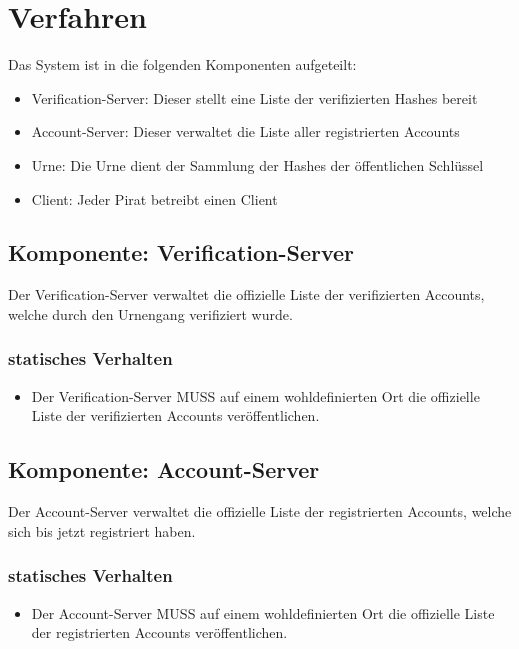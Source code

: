 \documentclass[a4paper,10pt]{article}
\begin{document}
\section{Verfahren} \label{sec:verfahren}
Das System ist in die folgenden Komponenten aufgeteilt:
\begin{itemize}
 \item Verification-Server: Dieser stellt eine Liste der verifizierten Hashes bereit
 \item Account-Server: Dieser verwaltet die Liste aller registrierten Accounts
 \item Urne: Die Urne dient der Sammlung der Hashes der öffentlichen Schlüssel
 \item Client: Jeder Pirat betreibt einen Client
\end{itemize}

\subsection{Komponente: Verification-Server}
Der Verification-Server verwaltet die offizielle Liste der verifizierten Accounts, welche durch den Urnengang verifiziert wurde.
\subsubsection{statisches Verhalten}
\begin{itemize}
 \item Der Verification-Server MUSS auf einem wohldefinierten Ort die offizielle Liste der verifizierten Accounts veröffentlichen.
\end{itemize}


\subsection{Komponente: Account-Server}
Der Account-Server verwaltet die offizielle Liste der registrierten Accounts, welche sich bis jetzt registriert haben.
\subsubsection{statisches Verhalten}
\begin{itemize}
 \item Der Account-Server MUSS auf einem wohldefinierten Ort die offizielle Liste der registrierten Accounts veröffentlichen.
\end{itemize}
\end{document}
